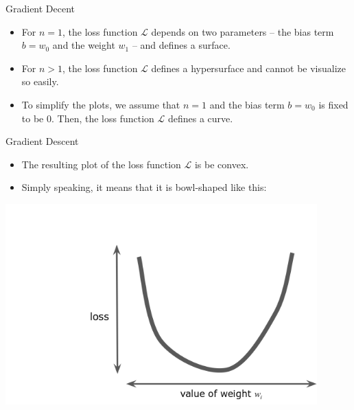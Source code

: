 \documentclass{beamer}
\begin{document}

\begin{frame}{Gradient Decent}
\begin{itemize}
\item For $n=1$, the loss function $\mathcal{L}$ depends on two parameters -- the bias term $b=w_0$ and the weight $w_1$ -- and defines a surface.

\medskip
\item For $n>1$, the loss function $\mathcal{L}$ defines a hypersurface and cannot be visualize so easily.

\medskip
\item To simplify the plots, we assume that $n=1$ and the bias term $b=w_0$ is fixed to be $0$.  Then, the loss function $\mathcal{L}$ defines a curve. 
\end{itemize}
\end{frame}


\begin{frame}{Gradient Descent}
\begin{itemize}
\item The resulting plot of the loss function $\mathcal{L}$ is be convex. 

\medskip
\item Simply speaking, it means that it is bowl-shaped like this:
\end{itemize}

\includegraphics[width=0.9\textwidth]{images/convex.png}
\end{frame}

\end{document}
